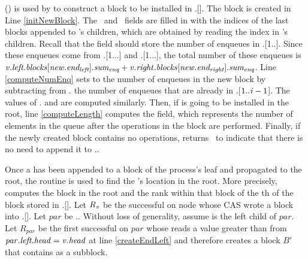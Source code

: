 () is used
by  to construct a block to be installed in .[].
The block  is created in Line \ref{initNewBlock}. 
The \eleft\ and \eright\ fields are filled in with the indices of the last blocks appended to 's
children, which are obtained by reading the  index in 's children.
Recall that the  field should store the number of enqueues in
.[1..].
Since these enqueues come from .[1...\eleft] and .[1...\eright],
the total number of these enqueues is $\mbox{\textit{v}}.\mbox{\textit{left.blocks}}[\mbox{\textit{new}}.\mbox{\textit{end\textsubscript{left}}}].\mbox{\textit{sum\textsubscript{enq}}} + \mbox{\textit{v}}.\mbox{\textit{right}}.\mbox{\textit{blocks}}[\mbox{\textit{new}}.\mbox{\textit{end\textsubscript{right}}}].\mbox{\textit{sum\textsubscript{enq}}}$.
Line \ref{computeNumEnq} sets  to the number of enqueues in the new block by
subtracting from . the number of enqueues that are already in .[$1..\mbox{\textit{i}}-1$].
The values of . and  are computed similarly.
Then, if 
is going to be installed in the root, line \ref{computeLength} computes the  field, which
represents the number of elements in the queue after the operations in the block are performed.
Finally, if the newly created block contains no operations,  returns \nl\ to indicate
that there is no need to append it to ..

Once a  has been appended to a block of the process's leaf and propagated to the root,
the  routine is used to find the 's location in the root.
More precisely, 
computes the block in the root and the rank
within that block  of the th  of the block  stored in .[].
Let $R\textsubscript{\mbox{\textit{v}}}$ be the successful  on node 
whose CAS wrote a block  into .[].
Let $par$ be .. Without loss of generality, assume 
 is the left child of $par$. Let
$R_{par}$ be the first successful  on $par$ whose  reads a
value greater than  from $\mbox{\textit{par}}.\mbox{\textit{left.head}}=\mbox{\textit{v}}.\mbox{\textit{head}}$ at line \ref{createEndLeft} and therefore creates a block $B'$ that contains
 as a subblock. 
 
